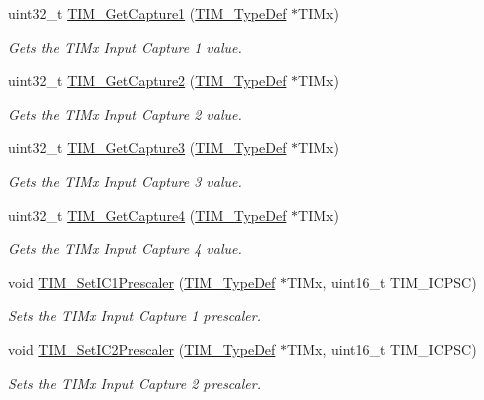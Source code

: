 \begin{DoxyCompactItemize}
uint32\+\_\+t \hyperlink{group___t_i_m___group3_ga6bd39ca543305ff0cd06fce0f678d94d}{T\+I\+M\+\_\+\+Get\+Capture1} (\hyperlink{struct_t_i_m___type_def}{T\+I\+M\+\_\+\+Type\+Def} $\ast$T\+I\+Mx)
\begin{DoxyCompactList}\small\item\em Gets the T\+I\+Mx Input Capture 1 value. \end{DoxyCompactList}\item 
uint32\+\_\+t \hyperlink{group___t_i_m___group3_ga2524cb5db14e388fb7f20c99fb3d58a5}{T\+I\+M\+\_\+\+Get\+Capture2} (\hyperlink{struct_t_i_m___type_def}{T\+I\+M\+\_\+\+Type\+Def} $\ast$T\+I\+Mx)
\begin{DoxyCompactList}\small\item\em Gets the T\+I\+Mx Input Capture 2 value. \end{DoxyCompactList}\item 
uint32\+\_\+t \hyperlink{group___t_i_m___group3_ga71ee9ce2c535ec0fb3fac5f9119221f7}{T\+I\+M\+\_\+\+Get\+Capture3} (\hyperlink{struct_t_i_m___type_def}{T\+I\+M\+\_\+\+Type\+Def} $\ast$T\+I\+Mx)
\begin{DoxyCompactList}\small\item\em Gets the T\+I\+Mx Input Capture 3 value. \end{DoxyCompactList}\item 
uint32\+\_\+t \hyperlink{group___t_i_m___group3_ga420b022cbc71ac603b5dd4922687abb1}{T\+I\+M\+\_\+\+Get\+Capture4} (\hyperlink{struct_t_i_m___type_def}{T\+I\+M\+\_\+\+Type\+Def} $\ast$T\+I\+Mx)
\begin{DoxyCompactList}\small\item\em Gets the T\+I\+Mx Input Capture 4 value. \end{DoxyCompactList}\item 
void \hyperlink{group___t_i_m___group3_gaf0f684dea88e222de9689d8ed0ca8805}{T\+I\+M\+\_\+\+Set\+I\+C1\+Prescaler} (\hyperlink{struct_t_i_m___type_def}{T\+I\+M\+\_\+\+Type\+Def} $\ast$T\+I\+Mx, uint16\+\_\+t T\+I\+M\+\_\+\+I\+C\+P\+SC)
\begin{DoxyCompactList}\small\item\em Sets the T\+I\+Mx Input Capture 1 prescaler. \end{DoxyCompactList}\item 
void \hyperlink{group___t_i_m___group3_ga3cc4869b5fe73271808512c89322a325}{T\+I\+M\+\_\+\+Set\+I\+C2\+Prescaler} (\hyperlink{struct_t_i_m___type_def}{T\+I\+M\+\_\+\+Type\+Def} $\ast$T\+I\+Mx, uint16\+\_\+t T\+I\+M\+\_\+\+I\+C\+P\+SC)
\begin{DoxyCompactList}\small\item\em Sets the T\+I\+Mx Input Capture 2 prescaler. \end{DoxyCompactList}\item 

\end{DoxyCompactItemize}
